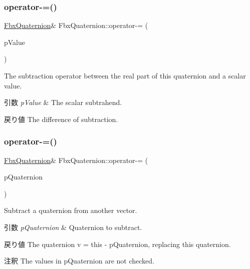 \subsubsection{\texorpdfstring{operator-\/=()}{operator-=()}\hspace{0.1cm}{\footnotesize\ttfamily [1/2]}}
{\footnotesize\ttfamily \hyperlink{class_fbx_quaternion}{Fbx\+Quaternion}\& Fbx\+Quaternion\+::operator-\/= (\begin{DoxyParamCaption}\item[{double}]{p\+Value }\end{DoxyParamCaption})}

The subtraction operator between the real part of this quaternion and a scalar value. 
\begin{DoxyParams}{引数}
{\em p\+Value} & The scalar subtrahend. \\
\hline
\end{DoxyParams}
\begin{DoxyReturn}{戻り値}
The difference of subtraction. 
\end{DoxyReturn}
\mbox{\label{class_fbx_quaternion_a2166c06ff00f0a768b3be0c64ebc919a}} 
\subsubsection{\texorpdfstring{operator-\/=()}{operator-=()}\hspace{0.1cm}{\footnotesize\ttfamily [2/2]}}
{\footnotesize\ttfamily \hyperlink{class_fbx_quaternion}{Fbx\+Quaternion}\& Fbx\+Quaternion\+::operator-\/= (\begin{DoxyParamCaption}\item[{const \hyperlink{class_fbx_quaternion}{Fbx\+Quaternion} \&}]{p\+Quaternion }\end{DoxyParamCaption})}

Subtract a quaternion from another vector. 
\begin{DoxyParams}{引数}
{\em p\+Quaternion} & Quaternion to subtract. \\
\hline
\end{DoxyParams}
\begin{DoxyReturn}{戻り値}
The quaternion v\textquotesingle{} = this -\/ p\+Quaternion, replacing this quaternion. 
\end{DoxyReturn}
\begin{DoxyRemark}{注釈}
The values in p\+Quaternion are not checked. 
\end{DoxyRemark}
\mbox{\label{class_fbx_quaternion_abd6988e25ac58f06cefc5d4045099cbe}} 
